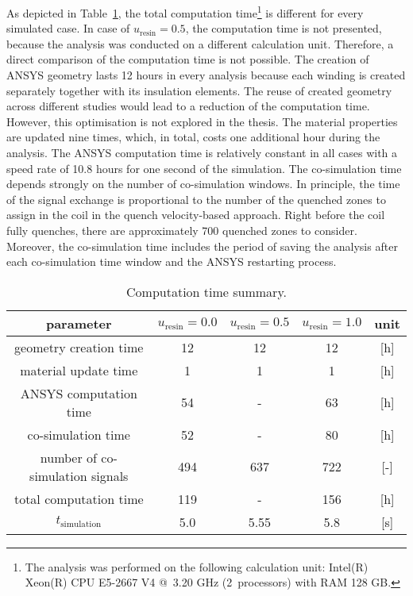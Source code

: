 As depicted in Table~\ref{table:skew_quad_computation_time_summary}, the total computation time\footnote{The analysis was performed on the following calculation unit: Intel(R) Xeon(R) CPU E5-2667 V4 @~3.20 GHz (2~processors) with RAM 128 GB.} is different for every simulated case. In case of $u_\text{resin}=0.5$, the computation time is not presented, because the analysis was conducted on a different calculation unit. Therefore, a direct comparison of the computation time is not possible. The creation of ANSYS geometry lasts 12 hours in every analysis because each winding is created separately together with its insulation elements. The reuse of created geometry across different studies would lead to a reduction of the computation time. However, this optimisation is not explored in the thesis. The material properties are updated nine times, which, in total, costs one additional hour during the analysis. The ANSYS computation time is relatively constant in all cases with a speed rate of 10.8 hours for one second of the simulation. The co-simulation time depends strongly on the number of co-simulation windows. In principle, the time of the signal exchange is proportional to the number of the quenched zones to assign in the coil in the quench velocity-based approach. Right before the coil fully quenches, there are approximately 700 quenched zones to consider. Moreover, the co-simulation time includes the period of saving the analysis after each co-simulation time window and the ANSYS restarting process.

\begin{table}[H]
    \caption{Computation time summary.} 
    \vspace{-1.em} 
    \fontsize{10}{10}
    \selectfont 
    \renewcommand{\arraystretch}{1.5}
    \begin{center}
        \begin{tabular}{ | c | c | c | c | c | }  
        \hline
        parameter & $u_\text{resin}=0.0$ & $u_\text{resin}=0.5$ & $u_\text{resin}=1.0$ & unit\\
        \hline
        geometry creation time & 12 & 12 & 12 & [h] \\
        material update time & 1 & 1 & 1 & [h] \\
        ANSYS computation time & 54 & - & 63 & [h] \\
        co-simulation time & 52 & - & 80 & [h] \\
        number of co-simulation signals & 494 & 637 & 722 & [-] \\
        \hline 
        total computation time & 119 & - & 156 & [h] \\
        \hline 
        $t_\text{simulation}$ & 5.0 & 5.55 & 5.8 & [s] \\
        \hline 
        \end{tabular}
    \end{center}  
     \label{table:skew_quad_computation_time_summary} 
\end{table}

